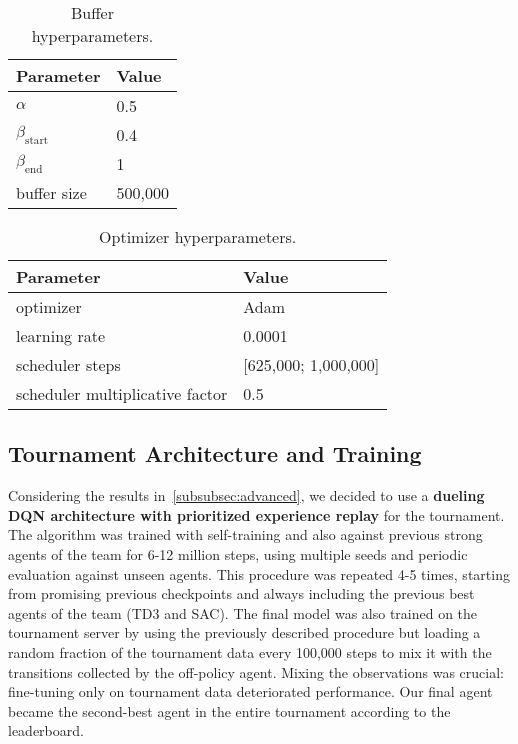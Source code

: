 \documentclass[11pt]{article}
\begin{document}
\begin{table}[H]
    \centering
    \caption{Buffer hyperparameters.}
    \begin{tabular}{ll}
    \toprule
    \textbf{Parameter} & \textbf{Value} \\
    \midrule
    $\alpha$ & 0.5 \\
    $\beta_\text{start}$ & 0.4 \\
    $\beta_\text{end}$ & 1 \\
    buffer size & 500,000 \\
    \bottomrule
    \end{tabular}
\end{table}

\begin{table}[H]
    \centering
    \caption{Optimizer hyperparameters.}
    \begin{tabular}{ll}
    \toprule
    \textbf{Parameter} & \textbf{Value} \\
    \midrule
    optimizer & Adam~\cite{kingma2017adam} \\
    learning rate & 0.0001 \\
    scheduler steps & [625,000; 1,000,000] \\
    scheduler multiplicative factor & 0.5 \\
    \bottomrule
    \end{tabular}
\end{table}

\subsection{Tournament Architecture and Training}

Considering the results in~\ref{subsubsec:advanced}, we decided to use a \textbf{dueling DQN architecture with prioritized experience replay} for the tournament. The algorithm was trained with self-training and also against previous strong agents of the team for 6-12 million steps, using multiple seeds and periodic evaluation against unseen agents. This procedure was repeated 4-5 times, starting from promising previous checkpoints and always including the previous best agents of the team (TD3 and SAC). The final model was also trained on the tournament server by using the previously described procedure but loading a random fraction of the tournament data every 100,000 steps to mix it with the transitions collected by the off-policy agent. Mixing the observations was crucial: fine-tuning only on tournament data deteriorated performance. Our final agent became the second-best agent in the entire tournament according to the leaderboard.
\end{document}
